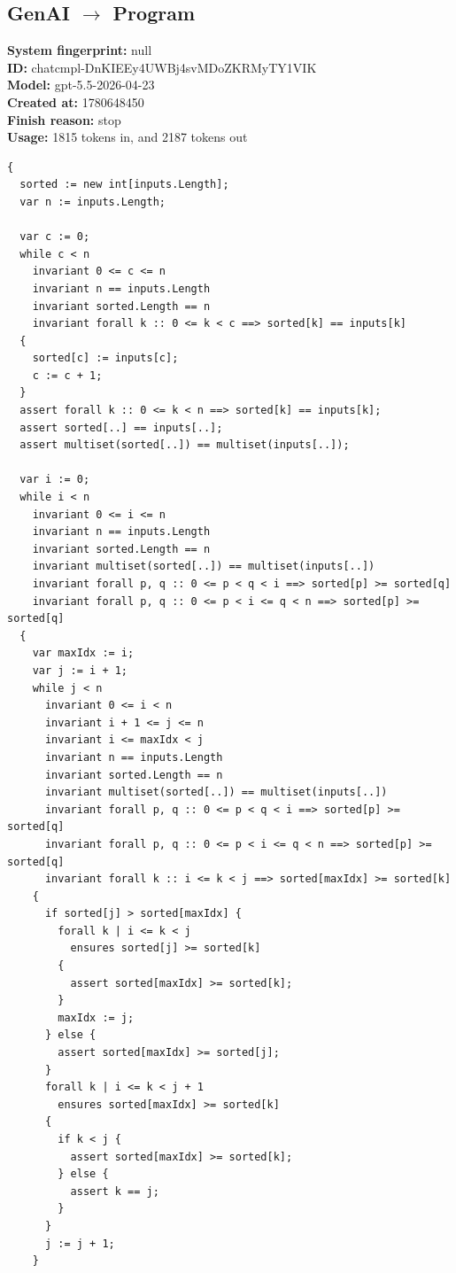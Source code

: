 \documentclass{article}
\begin{document}
\subsection*{GenAI $\rightarrow$ Program}
\textbf{System fingerprint: }null
\\\textbf{ID: }chatcmpl-DnKIEEy4UWBj4svMDoZKRMyTY1VIK
\\\textbf{Model: }gpt-5.5-2026-04-23
\\\textbf{Created at: }1780648450
\\\textbf{Finish reason: }stop
\\\textbf{Usage: }1815 tokens in, and 2187 tokens out
\begin{lstlisting}
{
  sorted := new int[inputs.Length];
  var n := inputs.Length;

  var c := 0;
  while c < n
    invariant 0 <= c <= n
    invariant n == inputs.Length
    invariant sorted.Length == n
    invariant forall k :: 0 <= k < c ==> sorted[k] == inputs[k]
  {
    sorted[c] := inputs[c];
    c := c + 1;
  }
  assert forall k :: 0 <= k < n ==> sorted[k] == inputs[k];
  assert sorted[..] == inputs[..];
  assert multiset(sorted[..]) == multiset(inputs[..]);

  var i := 0;
  while i < n
    invariant 0 <= i <= n
    invariant n == inputs.Length
    invariant sorted.Length == n
    invariant multiset(sorted[..]) == multiset(inputs[..])
    invariant forall p, q :: 0 <= p < q < i ==> sorted[p] >= sorted[q]
    invariant forall p, q :: 0 <= p < i <= q < n ==> sorted[p] >= sorted[q]
  {
    var maxIdx := i;
    var j := i + 1;
    while j < n
      invariant 0 <= i < n
      invariant i + 1 <= j <= n
      invariant i <= maxIdx < j
      invariant n == inputs.Length
      invariant sorted.Length == n
      invariant multiset(sorted[..]) == multiset(inputs[..])
      invariant forall p, q :: 0 <= p < q < i ==> sorted[p] >= sorted[q]
      invariant forall p, q :: 0 <= p < i <= q < n ==> sorted[p] >= sorted[q]
      invariant forall k :: i <= k < j ==> sorted[maxIdx] >= sorted[k]
    {
      if sorted[j] > sorted[maxIdx] {
        forall k | i <= k < j
          ensures sorted[j] >= sorted[k]
        {
          assert sorted[maxIdx] >= sorted[k];
        }
        maxIdx := j;
      } else {
        assert sorted[maxIdx] >= sorted[j];
      }
      forall k | i <= k < j + 1
        ensures sorted[maxIdx] >= sorted[k]
      {
        if k < j {
          assert sorted[maxIdx] >= sorted[k];
        } else {
          assert k == j;
        }
      }
      j := j + 1;
    }


\end{lstlisting}
\end{document}
